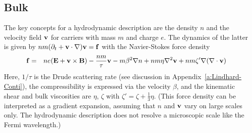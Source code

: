 \documentclass[11pt, oneside]{article}   	%
\begin{document}
\subsection{Bulk}
\label{s:intro-hydrodynamics}

The key concepts for a hydrodynamic description are the density $n$ and the 
velocity field ${\bf v}$ for
carriers with mass $m$ and charge $e$. The dynamics of the latter is given by 
$n m ( \partial_t + {\bf v} \cdot \nabla) {\bf v} = {\bf f}$ with the Navier-Stokes force density
\citep{landau1987fluid}
\begin{eqnarray}
	{\bf f} & = & n e ({\bf E} + {\bf v} \times {\bf B})
	- \frac{ n m }{ \tau } {\bf v}
	- m \beta^2 \nabla n
	+ n m \eta \nabla^2 {\bf v}
	+ n m \zeta' \nabla (\nabla \cdot {\bf v})
	\label{eq:Navier-Stokes}
\end{eqnarray}
Here, $1/\tau$ is the Drude scattering rate (see discussion in Appendix~\ref{a:Lindhard-Conti}), 
the compressibility is expressed via the velocity
$\beta$, and the kinematic shear and bulk viscosities are $\eta$, $\zeta$
with $\zeta' = \zeta + \frac13\eta$.
(This force density can be interpreted as a gradient expansion, 
assuming that $n$ and ${\bf v}$ vary on large scales only. The hydrodynamic description
does not resolve a microscopic scale like the Fermi wavelength.)
\end{document}
